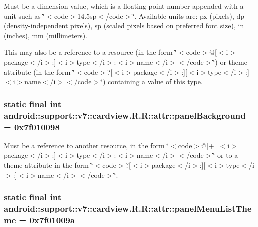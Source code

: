 Must be a dimension value, which is a floating point number appended with a unit such as \char`\"{}$<$code$>$14.5sp$<$/code$>$\char`\"{}. Available units are: px (pixels), dp (density-independent pixels), sp (scaled pixels based on preferred font size), in (inches), mm (millimeters). 

This may also be a reference to a resource (in the form \char`\"{}$<$code$>$@\mbox{[}$<$i$>$package$<$/i$>$:\mbox{]}$<$i$>$type$<$/i$>$:$<$i$>$name$<$/i$>$$<$/code$>$\char`\"{}) or theme attribute (in the form \char`\"{}$<$code$>$?\mbox{[}$<$i$>$package$<$/i$>$:\mbox{]}\mbox{[}$<$i$>$type$<$/i$>$:\mbox{]}$<$i$>$name$<$/i$>$$<$/code$>$\char`\"{}) containing a value of this type. \hypertarget{classandroid_1_1support_1_1v7_1_1cardview_1_1_r_1_1attr_201d459ba31744c12b8adec19a551f8f}{
\subsubsection[{panelBackground}]{\setlength{\rightskip}{0pt plus 5cm}static final int android::support::v7::cardview.R.R::attr::panelBackground = 0x7f010098}}
\label{classandroid_1_1support_1_1v7_1_1cardview_1_1_r_1_1attr_201d459ba31744c12b8adec19a551f8f}


Must be a reference to another resource, in the form \char`\"{}$<$code$>$@\mbox{[}+\mbox{]}\mbox{[}$<$i$>$package$<$/i$>$:\mbox{]}$<$i$>$type$<$/i$>$:$<$i$>$name$<$/i$>$$<$/code$>$\char`\"{} or to a theme attribute in the form \char`\"{}$<$code$>$?\mbox{[}$<$i$>$package$<$/i$>$:\mbox{]}\mbox{[}$<$i$>$type$<$/i$>$:\mbox{]}$<$i$>$name$<$/i$>$$<$/code$>$\char`\"{}. \hypertarget{classandroid_1_1support_1_1v7_1_1cardview_1_1_r_1_1attr_5fc9232b4ec9eaa4a1c94a413e18e941}{
\subsubsection[{panelMenuListTheme}]{\setlength{\rightskip}{0pt plus 5cm}static final int android::support::v7::cardview.R.R::attr::panelMenuListTheme = 0x7f01009a}}
\label{classandroid_1_1support_1_1v7_1_1cardview_1_1_r_1_1attr_5fc9232b4ec9eaa4a1c94a413e18e941}



